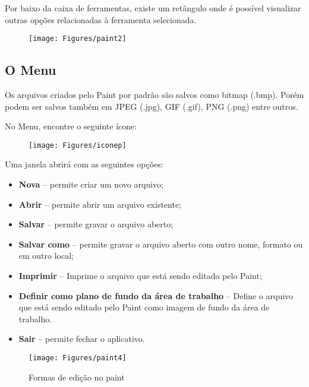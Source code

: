 \documentclass[hidelinks,12pt]{article}
\begin{document}
			Por baixo da caixa de ferramentas, existe um retângulo onde é possível visualizar outras opções relacionadas à ferramenta selecionada.


			\begin{figure}[!h]
				\centering
				\texttt{[image: Figures/paint2]}
				\label{fig:paint2}
			\end{figure}

			\subsection{O Menu}

			Os arquivos criados pelo Paint por padrão são salvos como bitmap (.bmp). Porém podem ser salvos também em JPEG (.jpg), GIF (.gif), PNG (.png) entre outros.

			No Menu, encontre o seguinte ícone:

			\begin{figure}[!h]
				\centering
				\texttt{[image: Figures/iconep]}
				\label{fig:paintp}
			\end{figure}

			Uma janela abrirá com as seguintes opções:

			\begin{itemize}
				\item {\bf Nova} – permite criar um novo arquivo;

				\item {\bf Abrir} – permite abrir um arquivo existente;

				\item {\bf Salvar} – permite gravar o arquivo aberto;

				\item {\bf Salvar como} – permite gravar o arquivo aberto com outro nome, formato ou em outro local;

				\item {\bf Imprimir} – Imprime o arquivo que está sendo editado pelo Paint;

				\item {\bf Definir como plano de fundo da área de trabalho} – Define o arquivo que está sendo editado pelo Paint como imagem de fundo da área de trabalho.

				\item {\bf Sair} – permite fechar o aplicativo.
			\end{itemize}
			\bigskip
			\begin{figure}[!h]
				\centering
				\texttt{[image: Figures/paint4]}
				\label{fig:paint4}
				\caption{Formas de edição no paint}
			\end{figure}
\end{document}
